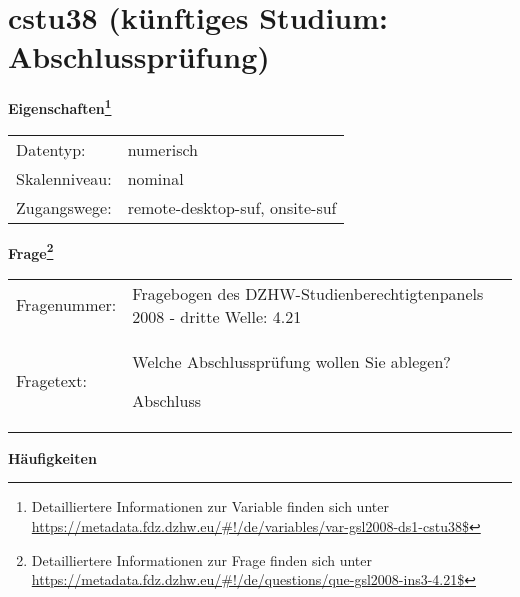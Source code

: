 
    \setcounter{footnote}{0}

    \vspace*{-1.8cm}
	\section{cstu38 (künftiges Studium: Abschlussprüfung)}
	\label{section:cstu38}



    \vspace*{0.5cm}
    \noindent\textbf{Eigenschaften\footnote{Detailliertere Informationen zur Variable finden sich unter
		\url{https://metadata.fdz.dzhw.eu/\#!/de/variables/var-gsl2008-ds1-cstu38$}}}\\
	\begin{tabularx}{\hsize}{@{}lX}
	Datentyp: & numerisch \\
	Skalenniveau: & nominal \\
	Zugangswege: &
	  remote-desktop-suf, 
	  onsite-suf
 \\
    \end{tabularx}



				\vspace*{0.5cm}
                \noindent\textbf{Frage\footnote{Detailliertere Informationen zur Frage finden sich unter
		              \url{https://metadata.fdz.dzhw.eu/\#!/de/questions/que-gsl2008-ins3-4.21$}}}\\
				\begin{tabularx}{\hsize}{@{}lX}
					Fragenummer: &
					  Fragebogen des DZHW-Studienberechtigtenpanels 2008 - dritte Welle:
					  4.21
 \\
					Fragetext: & Welche Abschlussprüfung wollen Sie ablegen?\par  Abschluss \\
				\end{tabularx}





        		\vspace*{0.5cm}
                \noindent\textbf{Häufigkeiten}

